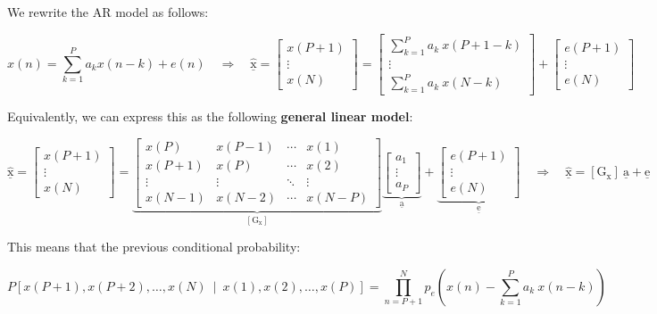 We rewrite the AR model as follows:

\[
x(n) = \sum_{k=1}^{P} a_k x(n-k) + e(n)
\quad \Rightarrow \quad
\underline{\hat{\mathrm{x}}} =
\begin{bmatrix}
x(P+1) \\[3pt]
\vdots \\[3pt]
x(N)
\end{bmatrix}
=
\begin{bmatrix}
\sum_{k=1}^{P} a_k \ x(P+1-k) \\[3pt]
\vdots \\[3pt]
\sum_{k=1}^{P} a_k \ x(N-k)
\end{bmatrix}
+
\begin{bmatrix}
e(P+1) \\[3pt]
\vdots \\[3pt]
e(N)
\end{bmatrix}
\]

Equivalently, we can express this as the following \textbf{general linear model}:

\[
\underline{\hat{\mathrm{x}}} =
\begin{bmatrix}
x(P+1) \\[3pt]
\vdots \\[3pt]
x(N)
\end{bmatrix}
=
\underbrace{
\begin{bmatrix}
x(P) & x(P-1) & \cdots & x(1) \\[3pt]
x(P+1) & x(P) & \cdots & x(2) \\[3pt]
\vdots & \vdots & \ddots & \vdots \\[3pt]
x(N-1) & x(N-2) & \cdots & x(N-P)
\end{bmatrix}}_{\left[\mathrm{G_x}\right]}
\underbrace{
\begin{bmatrix}
a_1 \\[3pt]
\vdots \\[3pt]
a_P
\end{bmatrix}}_{\underline{\mathrm{a}}}
+
\underbrace{
\begin{bmatrix}
e(P+1) \\[3pt]
\vdots \\[3pt]
e(N)
\end{bmatrix}}_{\underline{\mathrm{e}}}
\quad \Rightarrow \quad
\underline{\hat{\mathrm{x}}} = \left[\mathrm{G_x}\right] \ \underline{\mathrm{a}} + \underline{\mathrm{e}}
\]


This means that the previous conditional probability:

\[
P \left[ x(P+1), x(P+2), \ldots, x(N) \ \mid \ x(1), x(2), \ldots, x(P) \right]
= \prod_{n=P+1}^{N} p_e \left( x(n) - \sum_{k=1}^{P} a_k \ x(n-k) \right)
\]

